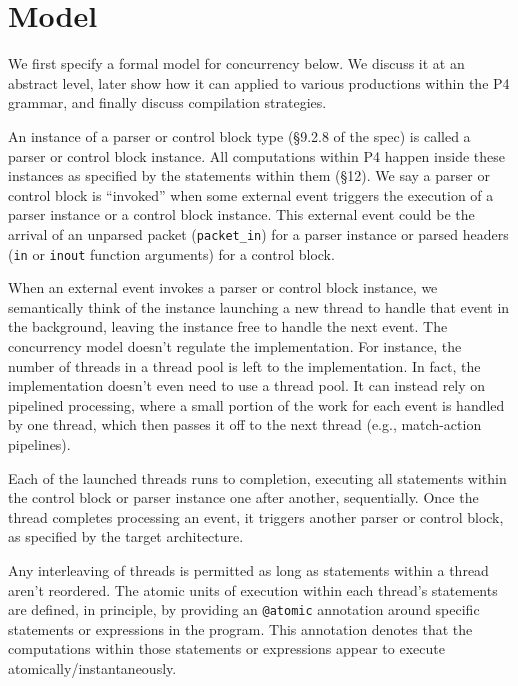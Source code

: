 \section{Model}

We first specify a formal model for concurrency below. We discuss it at an
abstract level, later show how it can applied to various productions within the
P4 grammar, and finally discuss compilation strategies.

An instance of a parser or control block type (\S9.2.8 of the spec) is called a
parser or control block instance.  All computations within P4 happen inside
these instances as specified by the statements within them (\S12).  We say a
parser or control block is ``invoked'' when some external event triggers the
execution of a parser instance or a control block instance.  This external
event could be the arrival of an unparsed packet (\texttt{packet\_in}) for a
parser instance or parsed headers (\texttt{in} or \texttt{inout} function
arguments) for a control block.

When an external event invokes a parser or control block instance, we
semantically think of the instance launching a new thread to handle that event
in the background, leaving the instance free to handle the next event. The
concurrency model doesn't regulate the implementation. For instance, the number
of threads in a thread pool is left to the implementation.  In fact, the
implementation doesn't even need to use a thread pool. It can instead rely on
pipelined processing, where a small portion of the work for each event is
handled by one thread, which then passes it off to the next thread (e.g.,
match-action pipelines).

Each of the launched threads runs to completion, executing all statements
within the control block or parser instance one after another, sequentially.
Once the thread completes processing an event, it triggers another parser or
control block, as specified by the target architecture.

Any interleaving of threads is permitted as long as statements within a thread
aren't reordered. The atomic units of execution within each thread's statements
are defined, in principle, by providing an \texttt{@atomic} annotation around
specific statements or expressions in the program. This annotation denotes that
the computations within those statements or expressions appear to execute
atomically/instantaneously.

